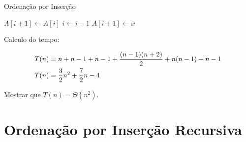 \documentclass[a4paper]{memoir}
\begin{document}
\begin{sol}

\begin{algorithm}
\caption*{Ordenação por Inserção}
\begin{algorithmic}[1]
 
   
   
   
    \State $A[i + 1] \gets A[i]$ 
    \State $i \gets i - 1$ 
  \EndWhile
  \State $A[i + 1] \gets x$ 
\EndFor
\EndFunction
\end{algorithmic}
\end{algorithm}

Calculo do tempo:

\[
\begin{gathered}
  T(n) = n + n - 1 + n - 1 + \frac{{(n - 1)(n + 2)}}{2} + n(n - 1) + n - 1 \hfill \\
  T(n) = \frac{3}{2}n^2  + \frac{7}{2}n - 4 \hfill \\ 
\end{gathered} 
\]

Mostrar que $T(n) = \Theta(n^2)$.
\end{sol}

\newpage 

\section{Ordenação por Inserção Recursiva}
\end{document}
